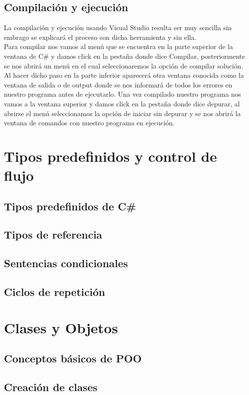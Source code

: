 \documentclass[12pt,a4paper]{report}
\begin{document}
\section{Compilación y ejecución}
La compilación y ejecución usando Visual Studio resulta ser muy sencilla sin embrago se explicará el proceso con dicha herramienta y sin ella.\\Para compilar nos vamos al menú que se encuentra en la parte superior de la ventana de C\# y damos click en la pestaña donde dice Compilar, posteriormente se nos abrirá un menú en el cual seleccionaremos la opción de compilar solución. Al hacer dicho paso en la parte inferior aparecerá otra ventana conocida como la ventana de salida o de output donde se nos informará de todos los errores en nuestro programa antes de ejecutarlo. Una vez compilado nuestro programa nos vamos a la ventana superior y damos click en la pestaña donde dice depurar, al abrirse el menú seleccionamos la opción de iniciar sin depurar y se nos abrirá la ventana de comandos con nuestro programa en ejecución.

\chapter{Tipos predefinidos y control de flujo}
\section{Tipos predefinidos de C\#}
\section{Tipos de referencia}
\section{Sentencias condicionales}
\section{Ciclos de repetición}

\chapter{Clases y Objetos}
\section{Conceptos básicos de POO}
\section{Creación de clases}
\end{document}
